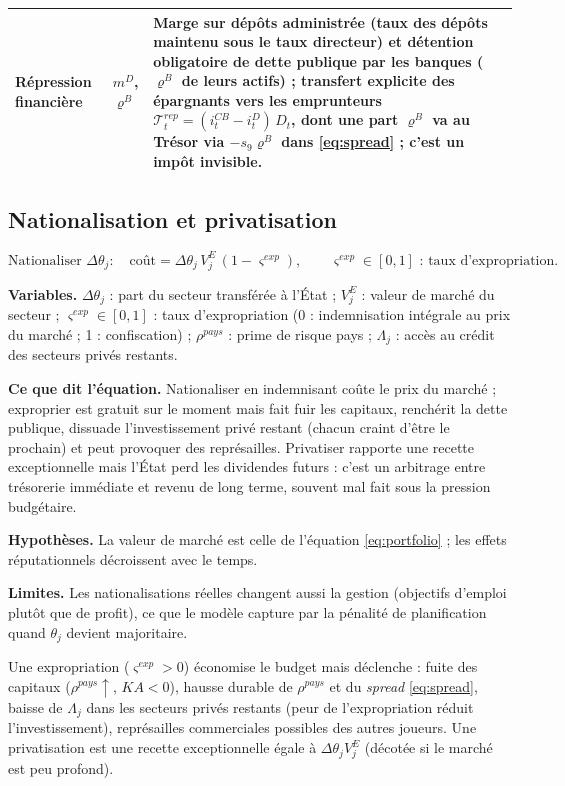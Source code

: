 \documentclass[11pt,a4paper]{article}
\newcommand{\variables}{\par\noindent\textbf{Variables.} }
\newcommand{\sens}{\par\noindent\textbf{Ce que dit l'équation.} }
\newcommand{\hyp}{\par\noindent\textbf{Hypothèses.} }
\newcommand{\limites}{\par\noindent\textbf{Limites.} }
\begin{document}
\begin{center}
\begin{tabular}{p{3.6cm}p{1.6cm}p{9.6cm}}
Répression financière & $m^D$, $\varrho^B$ & Marge sur dépôts administrée (taux des dépôts maintenu sous le taux directeur) et détention obligatoire de dette publique par les banques ($\varrho^B$ de leurs actifs) ; transfert explicite des épargnants vers les emprunteurs $\mathcal{T}^{rep}_t = (i^{CB}_t - i^D_t)\,D_t$, dont une part $\varrho^B$ va au Trésor via $-s_9\varrho^B$ dans \eqref{eq:spread} ; c'est un impôt invisible.\\

\bottomrule
\end{tabular}
\end{center}

\subsection{Nationalisation et privatisation}
\begin{equation}
\text{Nationaliser } \Delta\theta_j : \quad \text{coût} = \Delta\theta_j\, V^E_j\,(1 - \varsigma^{exp}) , \qquad
\varsigma^{exp} \in [0,1] \text{ : taux d'expropriation}.
\end{equation}
\begin{lecture}
\variables $\Delta\theta_j$ : part du secteur transférée à l'État ; $V^E_j$ : valeur de marché du secteur ; $\varsigma^{exp}\in[0,1]$ : taux d'expropriation (0 : indemnisation intégrale au prix du marché ; 1 : confiscation) ; $\rho^{pays}$ : prime de risque pays ; $\Lambda_j$ : accès au crédit des secteurs privés restants.
\sens Nationaliser en indemnisant coûte le prix du marché ; exproprier est gratuit sur le moment mais fait fuir les capitaux, renchérit la dette publique, dissuade l'investissement privé restant (chacun craint d'être le prochain) et peut provoquer des représailles. Privatiser rapporte une recette exceptionnelle mais l'État perd les dividendes futurs : c'est un arbitrage entre trésorerie immédiate et revenu de long terme, souvent mal fait sous la pression budgétaire.
\hyp La valeur de marché est celle de l'équation \eqref{eq:portfolio} ; les effets réputationnels décroissent avec le temps.
\limites Les nationalisations réelles changent aussi la gestion (objectifs d'emploi plutôt que de profit), ce que le modèle capture par la pénalité de planification quand $\theta_j$ devient majoritaire.
\end{lecture}
Une expropriation ($\varsigma^{exp} > 0$) économise le budget mais déclenche : fuite des capitaux ($\rho^{pays} \uparrow$, $KA<0$), hausse durable de $\rho^{pays}$ et du \emph{spread} \eqref{eq:spread}, baisse de $\Lambda_j$ dans les secteurs privés restants (peur de l'expropriation réduit l'investissement), représailles commerciales possibles des autres joueurs. Une privatisation est une recette exceptionnelle égale à $\Delta\theta_j V^E_j$ (décotée si le marché est peu profond).
\end{document}
